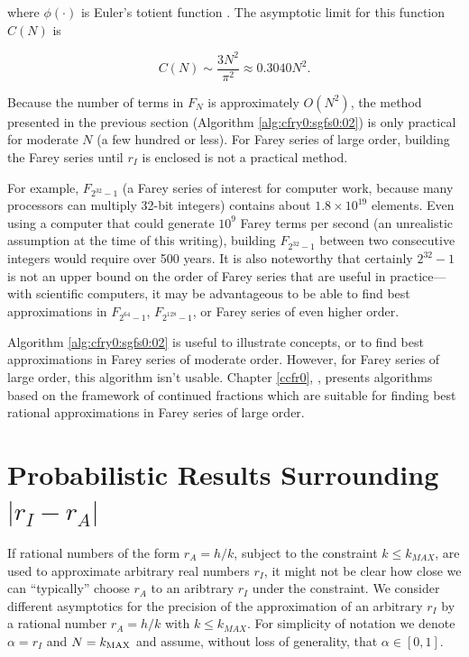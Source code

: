 \noindent{}where $\phi(\cdot{})$ is Euler's totient 
function \cite{bibref:w:PkuCnFareyPage}.  The 
asymptotic limit for this function $C(N)$ is

\begin{equation}
C(N) \sim{} \frac{3 N^2}{\pi{}^2} \approx 0.3040 N^2 .
\end{equation}

Because the number of terms in $F_N$ is approximately 
$O(N^2)$, the method presented in the previous section 
(Algorithm \ref{alg:cfry0:sgfs0:02}) is
only practical for moderate $N$ (a few hundred or less).  For Farey
series of large order, building the Farey series until $r_I$ is
enclosed is not a practical method.

For example, $F_{2^{32}-1}$ (a Farey series of interest for
computer work, because many processors can multiply 32-bit integers)
contains about $1.8 \times 10^{19}$ elements.  Even using a computer
that could generate $10^{9}$ Farey terms per second (an unrealistic
assumption at the time of this writing), building
$F_{2^{32}-1}$ between two consecutive integers would require over 500
years.  It is also noteworthy that certainly $2^{32}-1$ is not an upper
bound on the order of Farey series that are useful in practice---with
scientific computers, it may be advantageous to be able to find best
approximations in $F_{2^{64}-1}$, $F_{2^{128}-1}$, or Farey series
of even higher order.

Algorithm \ref{alg:cfry0:sgfs0:02} is useful to illustrate concepts, or
to find best approximations in Farey series of moderate order.  However,
for Farey series of large order, this algorithm isn't usable.  
Chapter \ref{ccfr0}, 
\emph{\ccfrzeroshorttitle{}}, presents algorithms based on the framework
of continued fractions which are suitable for finding best rational
approximations in Farey series of large order.


\section[Probabilistic Results Surrounding $| r_I - r_A |$]
        {Probabilistic Results Surrounding \mbox{\boldmath $| r_I - r_A |$}}

If rational numbers of the form $r_A = h/k$, subject to the constraint
$k \leq k_{MAX}$, are used to approximate arbitrary real numbers
$r_I$, it might not be clear how close we can ``typically'' choose
$r_A$ to an aribtrary $r_I$ under the constraint.
We consider different asymptotics for
the precision of the approximation of an arbitrary $r_I$ by a
rational number
$r_A=h/k$ with $k \leq k_{MAX}$. For simplicity of notation
we
denote $\alpha= r_I$ and $N=k_{ \rm MAX }$ and assume, without
loss of generality, that
$ \alpha \in [0,1]$.

